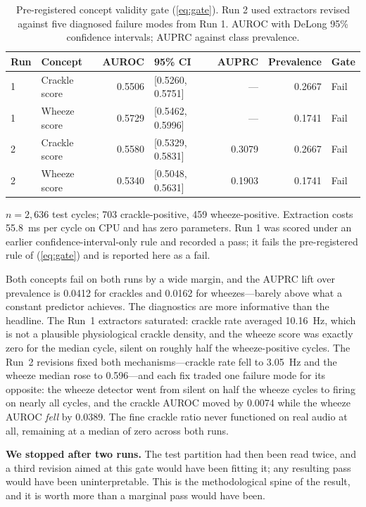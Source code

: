 \documentclass[journal,onecolumn]{IEEEtran}
\begin{document}
\begin{table}[!t]
\centering
\caption{Pre-registered concept validity gate (\ref{eq:gate}). Run 2 used extractors
revised against five diagnosed failure modes from Run 1. AUROC with DeLong 95\%
confidence intervals; AUPRC against class prevalence.}
\label{tab:gate}
\begin{tabular}{llrlrrl}
\toprule
Run & Concept & AUROC & 95\% CI & AUPRC & Prevalence & Gate \\
\midrule
1 & Crackle score & 0.5506 & [0.5260, 0.5751] & --- & 0.2667 & Fail \\
1 & Wheeze score  & 0.5729 & [0.5462, 0.5996] & --- & 0.1741 & Fail \\
2 & Crackle score & 0.5580 & [0.5329, 0.5831] & 0.3079 & 0.2667 & Fail \\
2 & Wheeze score  & 0.5340 & [0.5048, 0.5631] & 0.1903 & 0.1741 & Fail \\
\bottomrule
\end{tabular}

\vspace{2pt}
\footnotesize $n = 2{,}636$ test cycles; 703 crackle-positive, 459 wheeze-positive.
Extraction costs 55.8~ms per cycle on CPU and has zero parameters. Run 1 was scored
under an earlier confidence-interval-only rule and recorded a pass; it fails the
pre-registered rule of (\ref{eq:gate}) and is reported here as a fail.
\end{table}

Both concepts fail on both runs by a wide margin, and the AUPRC lift over prevalence
is 0.0412 for crackles and 0.0162 for wheezes---barely above what a constant
predictor achieves. The diagnostics are more informative than the headline. The Run~1
extractors saturated: crackle rate averaged 10.16~Hz, which is not a plausible
physiological crackle density, and the wheeze score was exactly zero for the median
cycle, silent on roughly half the wheeze-positive cycles. The Run~2 revisions fixed
both mechanisms---crackle rate fell to 3.05~Hz and the wheeze median rose to
0.596---and each fix traded one failure mode for its opposite: the wheeze detector
went from silent on half the wheeze cycles to firing on nearly all cycles, and the
crackle AUROC moved by 0.0074 while the wheeze AUROC \emph{fell} by 0.0389. The fine
crackle ratio never functioned on real audio at all, remaining at a median of zero
across both runs.

\textbf{We stopped after two runs.} The test partition had then been read twice, and a
third revision aimed at this gate would have been fitting it; any resulting pass would
have been uninterpretable. This is the methodological spine of the result, and it is
worth more than a marginal pass would have been.
\end{document}
